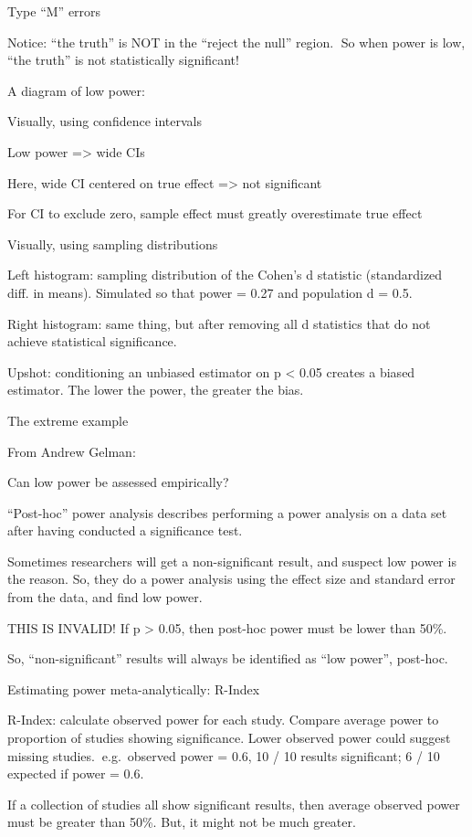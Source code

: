 \documentclass[
  letterpaper,
  DIV=11,
  numbers=noendperiod]{scrreprt}
\begin{document}
Type ``M'' errors

Notice: ``the truth'' is NOT in the ``reject the null'' region. So when
power is low, ``the truth'' is not statistically significant!

A diagram of low power:

Visually, using confidence intervals

Low power =\textgreater{} wide CIs

Here, wide CI centered on true effect =\textgreater{} not significant

For CI to exclude zero, sample effect must greatly overestimate true
effect

Visually, using sampling distributions

Left histogram: sampling distribution of the Cohen's d statistic
(standardized diff. in means). Simulated so that power = 0.27 and
population d = 0.5.

Right histogram: same thing, but after removing all d statistics that do
not achieve statistical significance.

Upshot: conditioning an unbiased estimator on p \textless{} 0.05 creates
a biased estimator. The lower the power, the greater the bias.

The extreme example

From Andrew Gelman:

Can low power be assessed empirically?

``Post-hoc'' power analysis describes performing a power analysis on a
data set after having conducted a significance test.

Sometimes researchers will get a non-significant result, and suspect low
power is the reason. So, they do a power analysis using the effect size
and standard error from the data, and find low power.

THIS IS INVALID! If p \textgreater{} 0.05, then post-hoc power must be
lower than 50\%.

So, ``non-significant'' results will always be identified as ``low
power'', post-hoc.

Estimating power meta-analytically: R-Index

R-Index: calculate observed power for each study. Compare average power
to proportion of studies showing significance. Lower observed power
could suggest missing studies.e.g.~observed power = 0.6, 10 / 10 results
significant; 6 / 10 expected if power = 0.6.

If a collection of studies all show significant results, then average
observed power must be greater than 50\%. But, it might not be much
greater.
\end{document}
